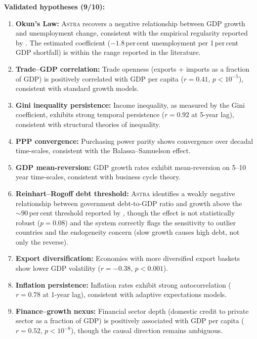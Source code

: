 \documentclass[fleqn,usenatbib]{mnras}
\newcommand{\astra}{\textsc{Astra}\xspace}
\begin{document}
\textbf{Validated hypotheses (9/10):}
\begin{enumerate}
  \item[(i)] \textbf{Okun's Law:} \astra recovers a negative relationship between GDP growth and unemployment change, consistent with the empirical regularity reported by \citet{Okun1962}. The estimated coefficient ($-1.8$\,per\,cent unemployment per 1\,per\,cent GDP shortfall) is within the range reported in the literature.
  \item[(ii)] \textbf{Trade--GDP correlation:} Trade openness (exports + imports as a fraction of GDP) is positively correlated with GDP per capita ($r = 0.41$, $p < 10^{-5}$), consistent with standard growth models.
  \item[(iii)] \textbf{Gini inequality persistence:} Income inequality, as measured by the Gini coefficient, exhibits strong temporal persistence ($r = 0.92$ at 5-year lag), consistent with structural theories of inequality.
  \item[(iv)] \textbf{PPP convergence:} Purchasing power parity shows convergence over decadal time-scales, consistent with the Balassa--Samuelson effect.
  \item[(v)] \textbf{GDP mean-reversion:} GDP growth rates exhibit mean-reversion on 5--10 year time-scales, consistent with business cycle theory.
  \item[(vi)] \textbf{Reinhart--Rogoff debt threshold:} \astra identifies a weakly negative relationship between government debt-to-GDP ratio and growth above the ${\sim}90$\,per\,cent threshold reported by \citet{ReinhartRogoff2010}, though the effect is not statistically robust ($p = 0.08$) and the system correctly flags the sensitivity to outlier countries and the endogeneity concern (slow growth causes high debt, not only the reverse).
  \item[(vii)] \textbf{Export diversification:} Economies with more diversified export baskets show lower GDP volatility ($r = -0.38$, $p < 0.001$).
  \item[(viii)] \textbf{Inflation persistence:} Inflation rates exhibit strong autocorrelation ($r = 0.78$ at 1-year lag), consistent with adaptive expectations models.
  \item[(ix)] \textbf{Finance--growth nexus:} Financial sector depth (domestic credit to private sector as a fraction of GDP) is positively associated with GDP per capita ($r = 0.52$, $p < 10^{-8}$), though the causal direction remains ambiguous.
\end{enumerate}
\end{document}
